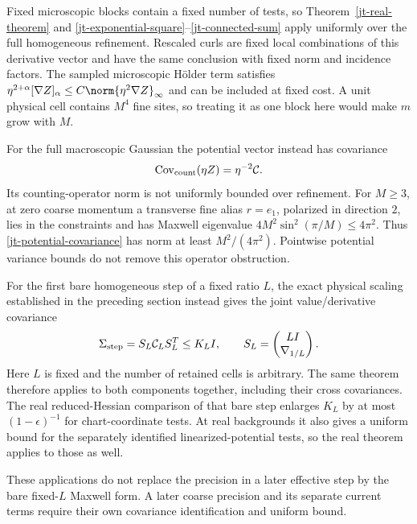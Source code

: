 Fixed microscopic blocks contain a fixed number of tests, so
Theorem~\ref{jt-real-theorem} and
\eqref{jt-exponential-square}--\eqref{jt-connected-sum} apply
uniformly over the full homogeneous refinement. Rescaled curls
are fixed local combinations of this derivative vector and
have the same conclusion with fixed norm and incidence factors.
The sampled microscopic H\"older term satisfies
$\eta^{2+\alpha}[\nabla Z]_\alpha
\le C\norm{\eta^2\nabla Z}_\infty$ and can be included at
fixed cost. A unit physical cell contains $M^4$ fine sites,
so treating it as one block here would make $m$ grow with $M$.

For the full macroscopic Gaussian the potential vector instead
has covariance
\begin{equation}\label{jt-potential-covariance}
 \operatorname{Cov}_{\rm count}(\eta Z)=\eta^{-2}\mathcal C.
\end{equation}
Its counting-operator norm is not uniformly bounded over
refinement. For $M\ge3$, at zero coarse momentum a transverse fine alias
$r=e_1$, polarized in direction $2$, lies in the constraints
and has Maxwell eigenvalue $4M^2\sin^2(\pi/M)\le4\pi^2$.
Thus \eqref{jt-potential-covariance} has norm at least
$M^2/(4\pi^2)$. Pointwise potential variance bounds do not
remove this operator obstruction.

For the first bare homogeneous step of a fixed ratio $L$, the
exact physical scaling established in the preceding section
instead gives the joint value/derivative covariance
\begin{equation}\label{jt-fixed-step-covariance}
 \Sigma_{\rm step}=S_L\mathcal C_LS_L^T\le K_LI,
 \qquad S_L=\begin{pmatrix}LI\\\nabla_{1/L}\end{pmatrix}.
\end{equation}
Here $L$ is fixed and the number of retained cells is arbitrary.
The same theorem therefore applies to both components together,
including their cross covariances. The real reduced-Hessian
comparison of that bare step enlarges $K_L$ by at most
$(1-\epsilon)^{-1}$ for chart-coordinate tests. At real
backgrounds it also gives a uniform bound for the separately
identified linearized-potential tests, so the real theorem
applies to those as well.

These applications do not replace the precision in a later
effective step by the bare fixed-$L$ Maxwell form. A later
coarse precision and its separate current terms require their
own covariance identification and uniform bound.


